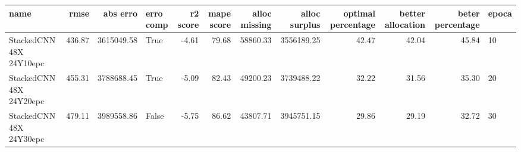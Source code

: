 \begin{tabular}{lrrlrrrrrrrl}
\toprule
name & rmse & abs erro & erro comp & r2 score & mape score & alloc missing & alloc surplus & optimal percentage & better allocation & beter percentage & epoca \\
\midrule
StackedCNN 48X 24Y10epc & 436.87 & 3615049.58 & True & -4.61 & 79.68 & 58860.33 & 3556189.25 & 42.47 & 42.04 & 45.84 & 10 \\
StackedCNN 48X 24Y20epc & 455.31 & 3788688.45 & True & -5.09 & 82.43 & 49200.23 & 3739488.22 & 32.22 & 31.56 & 35.30 & 20 \\
StackedCNN 48X 24Y30epc & 479.11 & 3989558.86 & False & -5.75 & 86.62 & 43807.71 & 3945751.15 & 29.86 & 29.19 & 32.72 & 30 \\
\bottomrule
\end{tabular}
